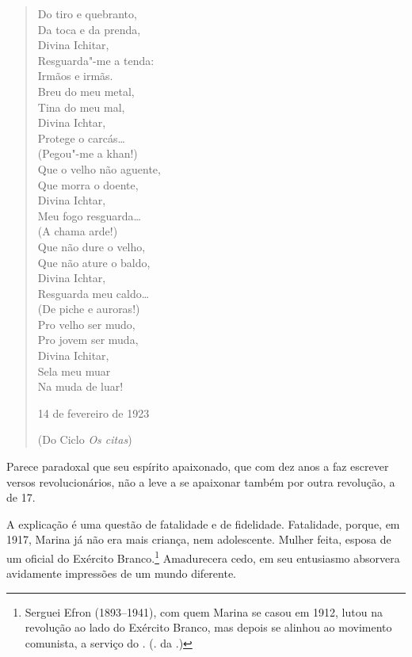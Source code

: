 \begin{verse}
Do tiro e quebranto, \\
Da toca e da prenda, \\
Divina Ichitar, \\
Resguarda"-me a tenda: \\[8pt]
Irmãos e irmãs. \\[8pt]
Breu do meu metal, \\
Tina do meu mal, \\
Divina Ichtar, \\
Protege o carcás\ldots{} \\[8pt]
(Pegou"-me a khan!) \\[8pt]
Que o velho não aguente, \\
Que morra o doente, \\
Divina Ichtar, \\
Meu fogo resguarda\ldots{} \\[8pt]
(A chama arde!) \\[8pt]
Que não dure o velho, \\
Que não ature o baldo, \\
Divina Ichtar, \\
Resguarda meu caldo\ldots{} \\[8pt]
(De piche e auroras!) \\[8pt]
Pro velho ser mudo, \\
Pro jovem ser muda, \\
Divina Ichitar, \\
Sela meu muar \\
Na muda de luar!

14 de fevereiro de 1923

(Do Ciclo \emph{Os citas})

\end{verse}

Parece paradoxal que seu espírito apaixonado, que com dez anos a
faz escrever versos revolucionários, não a leve a se apaixonar
também por outra revolução, a de 17.

A explicação é uma questão de fatalidade e de fidelidade.
Fatalidade, porque, em 1917, Marina já não era mais criança,
nem adolescente. Mulher feita, esposa de um oficial do Exército
Branco.\footnote{Serguei Efron (1893--1941), com quem Marina se
casou em 1912, lutou na revolução ao lado do Exército Branco, mas
depois se alinhou ao movimento comunista, a serviço do
. (. da .)} Amadurecera cedo, em
seu entusiasmo absorvera avidamente impressões de um mundo
diferente.

